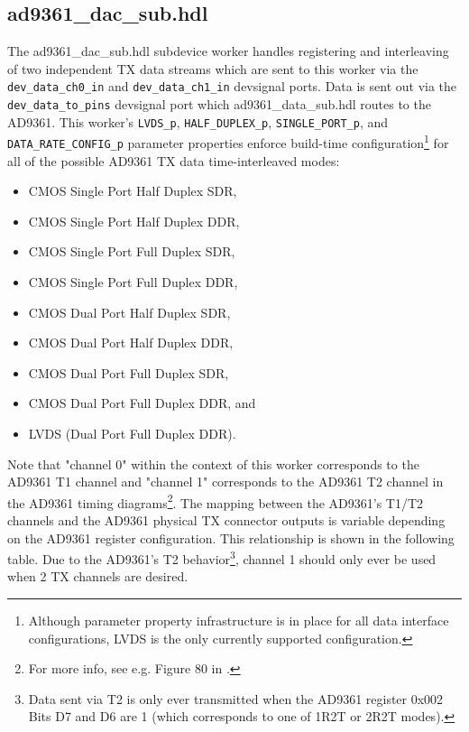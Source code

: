 \documentclass{article}
\def\comp{ad9361\_dac\_sub}
\begin{document}
\subsection*{\comp.hdl}
\begin{sloppypar}
The \comp.hdl subdevice worker handles registering and interleaving of two independent TX data streams which are sent to this worker via the \verb+dev_data_ch0_in+ and \verb+dev_data_ch1_in+ devsignal ports. Data is sent out via the \verb+dev_data_to_pins+ devsignal port which ad9361\_data\_sub.hdl routes to the AD9361\cite{data_sub_comp_datasheet}. This worker's \verb+LVDS_p+, \verb+HALF_DUPLEX_p+, \verb+SINGLE_PORT_p+, and \verb+DATA_RATE_CONFIG_p+ parameter properties enforce build-time configuration\footnote{Although parameter property infrastructure is in place for all data interface configurations, LVDS is the only currently supported configuration.} for all of the possible AD9361 TX data time-interleaved modes:
\begin{itemize}
	\item CMOS Single Port Half Duplex SDR,
	\item CMOS Single Port Half Duplex DDR,
	\item CMOS Single Port Full Duplex SDR,
	\item CMOS Single Port Full Duplex DDR,
	\item CMOS Dual Port Half Duplex SDR,
	\item CMOS Dual Port Half Duplex DDR,
	\item CMOS Dual Port Full Duplex SDR,
	\item CMOS Dual Port Full Duplex DDR, and
	\item LVDS (Dual Port Full Duplex DDR).
\end{itemize}
\pagebreak
Note that "channel 0" within the context of this worker corresponds to the AD9361 T1 channel and "channel 1" corresponds to the AD9361 T2 channel in the AD9361 timing diagrams\footnote{For more info, see e.g. Figure 80 in \cite{adi_ug570}.}. The mapping between the AD9361's T1/T2 channels and the AD9361 physical TX connector outputs is variable depending on the AD9361 register configuration. This relationship is shown in the following table.  Due to the AD9361's T2 behavior\footnote{\label{t2}Data sent via T2 is only ever transmitted when the AD9361 register 0x002 Bits D7 and D6 are 1 (which corresponds to one of 1R2T or 2R2T modes).}, channel 1 should only ever be used when 2 TX channels are desired.
\end{sloppypar}
\end{document}

